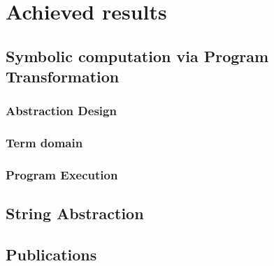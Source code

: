 \chapter{Achieved results}
\label{ch:results}


\section{Symbolic computation via Program Transformation}
\label{sec:symbolic}

\subsection{Abstraction Design}


\subsection{Term domain}

\subsection{ Program Execution }




\section{String Abstraction}
\label{sec:string}



\section{Publications}
\label{sec:publications}

